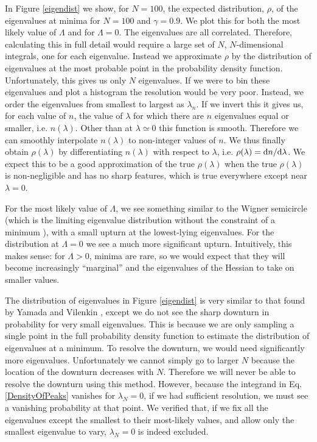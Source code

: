 \documentclass[12pt]{article}
\begin{document}
In Figure \ref{eigendist} we show, for $N=100$, the expected distribution, $\rho$, of the eigenvalues at minima for $N=100$ and $\gamma=0.9$. We plot this for both the most likely value of $\Lambda$ and for $\Lambda = 0$. The eigenvalues are all correlated. Therefore, calculating this in full detail would require a large set of $N$, $N$-dimensional integrals, one for each eigenvalue. Instead we approximate $\rho$ by the distribution of eigenvalues at the most probable point in the probability density function. Unfortunately, this gives us only $N$ eigenvalues. If we were to bin these eigenvalues and plot a histogram the resolution would be very poor. Instead, we order the eigenvalues from smallest to largest as $\lambda_n$. If we invert this it gives us, for each value of $n$, the value of $\lambda$ for which there are $n$ eigenvalues equal or smaller, i.e. $n(\lambda)$. Other than at $\lambda\simeq 0$ this function is smooth. Therefore we can smoothly interpolate $n(\lambda)$ to non-integer values of $n$. We thus finally obtain $\rho(\lambda)$ by differentiating $n(\lambda)$ with respect to $\lambda$, i.e. $\rho(\lambda) = {\rm d}n/{\rm d}\lambda$. We expect this to be a good approximation of the true $\rho(\lambda)$ when the true $\rho(\lambda)$ is non-negligible and has no sharp features, which is true everywhere except near $\lambda=0$.

For the most likely value of $\Lambda$, we see something similar to the Wigner semicircle (which is the limiting eigenvalue distribution without the constraint of a minimum \cite{Wigner1955,Wigner1958}), with a small upturn at the lowest-lying eigenvalues. For the distribution at $\Lambda=0$ we see a much more significant upturn. Intuitively, this makes sense: for $\Lambda > 0$, minima are rare, so we would expect that they will become increasingly ``marginal'' and the eigenvalues of the Hessian to take on smaller values.

The distribution of eigenvalues in Figure \ref{eigendist} is very similar to that found by Yamada and Vilenkin \cite{Yamada2018}, except we do not see the sharp downturn in probability for very small eigenvalues. This is because we are only sampling a single point in the full probability density function to estimate the distribution of eigenvalues at a minimum. To resolve the downturn, we would need significantly more eigenvalues. Unfortunately we cannot simply go to larger $N$ because the location of the downturn decreases with $N$. Therefore we will never be able to resolve the downturn using this method. However, because the integrand in Eq. \ref{DensityOfPeaks} vanishes for $\lambda_N=0$, if we had sufficient resolution, we must see a vanishing probability at that point. We verified that, if we fix all the eigenvalues except the smallest to their most-likely values, and allow only the smallest eigenvalue to vary, $\lambda_N=0$ is indeed excluded.
\end{document}
